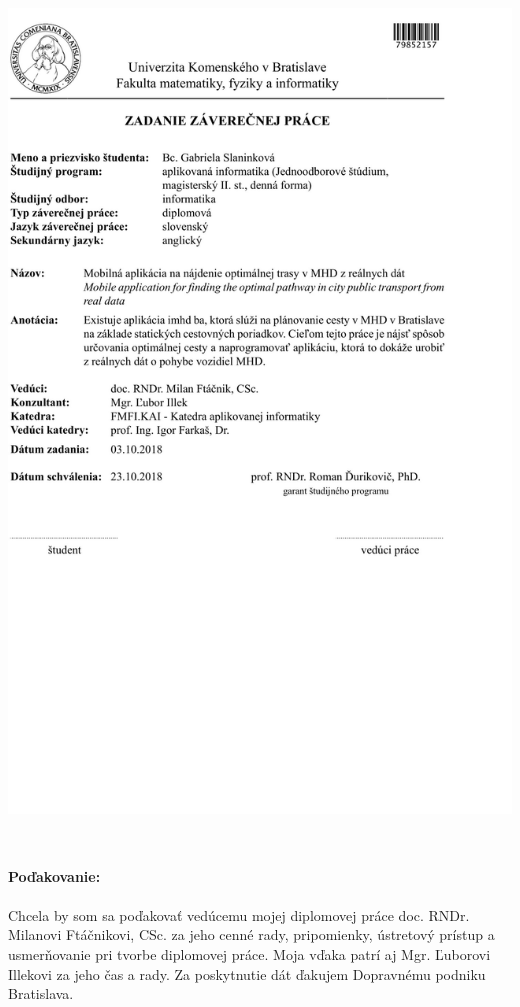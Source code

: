 \documentclass[12pt, oneside]{book}
\begin{document}
\newpage 
\thispagestyle{empty}
\hspace{-0.7cm}\includegraphics[width=1.1\textwidth]{images/zadanie}


\frontmatter

\setcounter{page}{3}
\newpage 
~

\vfill
{\bf Poďakovanie:}
\\ \\
Chcela by som sa poďakovať vedúcemu mojej diplomovej práce doc. RNDr. Milanovi Ftáčnikovi, CSc. za jeho cenné rady, pripomienky, ústretový prístup a usmerňovanie pri
tvorbe diplomovej práce. Moja vďaka patrí aj Mgr. Ľuborovi Illekovi za jeho čas a rady. Za poskytnutie dát ďakujem Dopravnému podniku Bratislava.
\end{document}
